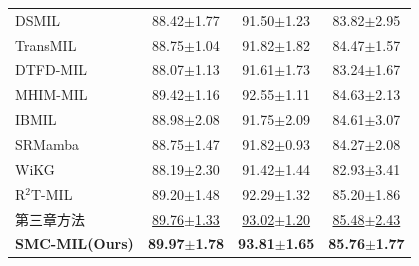 {\begin{xltabular}{\textwidth}{XCCC}
  DSMIL~\cite{li2021dual}          & 88.42$\pm$1.77& 91.50$\pm$1.23& 83.82$\pm$2.95\\
  TransMIL~\cite{shao2021transmil} & 88.75$\pm$1.04& 91.82$\pm$1.82& 84.47$\pm$1.57\\
  DTFD-MIL~\cite{zhang2022dtfd}    & 88.07$\pm$1.13&91.61$\pm$1.73& 83.24$\pm$1.67\\
  MHIM-MIL~\cite{tang2023multiple}    & 89.42$\pm$1.16& 92.55$\pm$1.11& 84.63$\pm$2.13\\
  IBMIL~\cite{lin2023interventional}    & 88.98$\pm$2.08&91.75$\pm$2.09& 84.61$\pm$3.07\\
  SRMamba~\cite{yang2024mambamil}& 88.75$\pm$1.47 &91.82$\pm$0.93 & 84.27$\pm$2.08\\
  WiKG ~\cite{li2024dynamic} & 88.19$\pm$2.30& 91.42$\pm$1.44& 82.93$\pm$3.41 \\
  R$^2$T-MIL ~\cite{tang2024feature} & 89.20$\pm$1.48 & 92.29$\pm$1.32 & 85.20$\pm$1.86\\
  第三章方法 & \underline{89.76$\pm$1.33}& \underline{93.02$\pm$1.20}& \underline{85.48$\pm$2.43}\\
  \textbf{SMC-MIL(Ours)}& \textbf{89.97$\pm$1.78}& \textbf{93.81$\pm$1.65}& \textbf{85.76$\pm$1.77}\\

\end{xltabular}}

